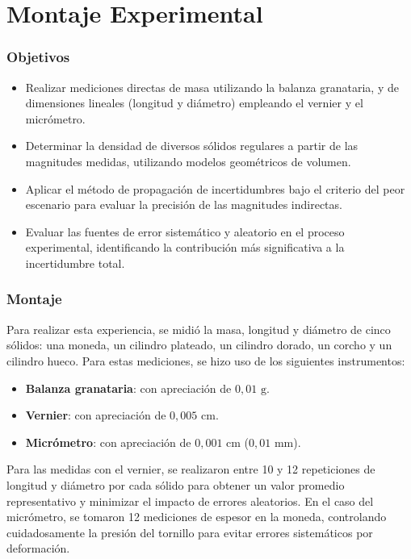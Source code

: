 \chapter{Montaje Experimental}
\thispagestyle{fancy}
\label{ch:montaje}

\subsection{Objetivos}

\begin{itemize}
    \item Realizar mediciones directas de masa utilizando la balanza granataria, y de dimensiones lineales (longitud y diámetro) empleando el vernier y el micrómetro. 
    \item Determinar la densidad de diversos sólidos regulares a partir de las magnitudes medidas, utilizando modelos geométricos de volumen. 
    \item Aplicar el método de propagación de incertidumbres bajo el criterio del peor escenario para evaluar la precisión de las magnitudes indirectas. 
    \item Evaluar las fuentes de error sistemático y aleatorio en el proceso experimental, identificando la contribución más significativa a la incertidumbre total. 
\end{itemize}

\subsection{Montaje}

Para realizar esta experiencia, se midió la masa, longitud y diámetro de cinco sólidos: una moneda, un cilindro plateado, un cilindro dorado, un corcho y un cilindro hueco. Para estas mediciones, se hizo uso de los siguientes instrumentos:
 
\begin{itemize}
    \item \textbf{Balanza granataria}: con apreciación de $0,01 \text{ g}$. 
    \item \textbf{Vernier}: con apreciación de $0,005 \text{ cm}$. 
    \item \textbf{Micrómetro}: con apreciación de $0,001 \text{ cm}$ ($0,01 \text{ mm}$).
\end{itemize}

Para las medidas con el vernier, se realizaron entre 10 y 12 repeticiones de longitud y diámetro por cada sólido para obtener un valor promedio representativo y minimizar el impacto de errores aleatorios.  En el caso del micrómetro, se tomaron 12 mediciones de espesor en la moneda, controlando cuidadosamente la presión del tornillo para evitar errores sistemáticos por deformación. 

